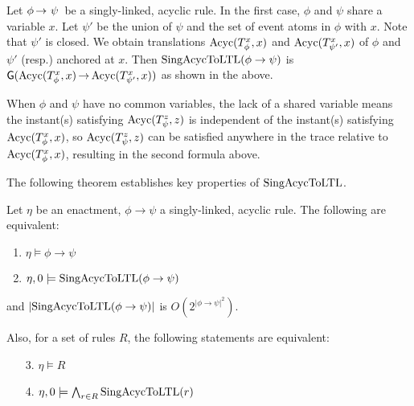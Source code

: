 Let $\phi\,{\rightarrow}\,\,{\psi}\,$ be a singly-linked, acyclic rule.
In the first case, $\phi$ and $\psi$ share a variable $x$.
Let $\psi'$ be the union of $\psi$ and
the set of event atoms in $\phi$ with $x$.
Note that $\psi'$ is closed.
We obtain translations
$\text{Acyc}(T_{\phi}^x,x)$ and $\text{Acyc}(T_{\psi'}^{x},x)$
of
$\phi$ and $\psi'$ (resp.)
anchored at $x$.
Then $\text{SingAcycToLTL}(\phi\rightarrow\psi)$ is 
$\textsf{G}(\text{Acyc}(T_\phi^x,x)\,{\to}\,
\text{Acyc}(T_{\psi'}^x,x))$
as shown in the above.

When $\phi$ and $\psi$
have no common variables,
the lack of a shared variable
means the instant(s) satisfying $\text{Acyc}(T_\psi^z,z)$ 
is independent of the instant(s)
satisfying $\text{Acyc}(T_\phi^x,x)$,
so $\text{Acyc}(T_\psi^z,z)$ can be satisfied 
anywhere in the trace relative to $\text{Acyc}(T_\phi^x,x)$,
resulting in the second formula above.

The following theorem establishes
key properties of $\text{SingAcycToLTL}$.

\begin{thm}\label{thm:rule-translation}
  Let $\eta$ be an enactment,
  $\phi\rightarrow\psi$ a singly-linked, acyclic rule.
  The following are equivalent:
  \begin{enumerate}
  \item $\eta\models \phi\rightarrow\psi$
  \item $\eta,0\models\text{SingAcycToLTL}(\phi\rightarrow\psi)$
  \end{enumerate}
  and
  $|\text{SingAcycToLTL}(\phi\rightarrow\psi)|$ is $O(2^{|\phi\rightarrow\psi|^{2}})$.
  
  Also,
  for a set of rules $R$,
  the following statements are equivalent:
  \begin{enumerate}
  \item[3.] $\eta\models R$
  \item[4.] $\eta,0\models \bigwedge_{r \in R} \text{SingAcycToLTL}(r)$
  \end{enumerate}
\end{thm}

